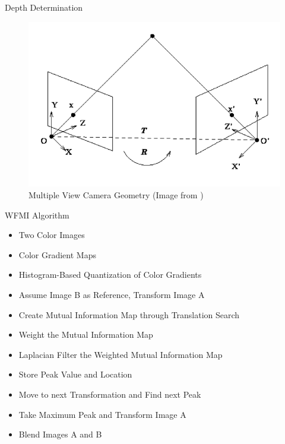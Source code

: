 \documentclass{beamer}
\begin{document}
\begin{frame}[t]{\sc Depth Determination}

\begin{figure}[!h]
\centering
\includegraphics[width=.9\columnwidth]{CameraGeometry}
\caption{Multiple View Camera Geometry (Image from \cite{Hartley2003})}
\label{CameraGeometry}
\end{figure}

\end{frame}



\begin{frame}[c]{\sc WFMI Algorithm}
\begin{itemize}
\item Two Color Images
\item Color Gradient Maps
\item Histogram-Based Quantization of Color Gradients
\item Assume Image B as Reference, Transform Image A
\item Create Mutual Information Map through Translation Search
\item Weight the Mutual Information Map
\item Laplacian Filter the Weighted Mutual Information Map
\item Store Peak Value and Location
\item Move to next Transformation and Find next Peak
\item Take Maximum Peak and Transform Image A
\item Blend Images A and B
\end{itemize}
\end{frame}
\end{document}
